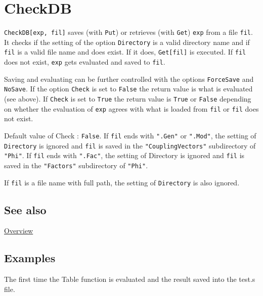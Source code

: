 \documentclass[../FeynCalcManual.tex]{subfiles}
\begin{document}
\hypertarget{checkdb}{
\section{CheckDB}\label{checkdb}}

\texttt{CheckDB[\allowbreak{}exp,\ \allowbreak{}fil]} saves (with
\texttt{Put}) or retrieves (with \texttt{Get}) \texttt{exp} from a file
\texttt{fil}. It checks if the setting of the option \texttt{Directory}
is a valid directory name and if \texttt{fil} is a valid file name and
does exist. If it does, \texttt{Get[\allowbreak{}fil]} is executed. If
\texttt{fil} does not exist, \texttt{exp} gets evaluated and saved to
\texttt{fil}.

Saving and evaluating can be further controlled with the options
\texttt{ForceSave} and \texttt{NoSave}. If the option \texttt{Check} is
set to \texttt{False} the return value is what is evaluated (see above).
If \texttt{Check} is set to \texttt{True} the return value is
\texttt{True} or \texttt{False} depending on whether the evaluation of
\texttt{exp} agrees with what is loaded from \texttt{fil} or
\texttt{fil} does not exist.

Default value of Check : \texttt{False}. If \texttt{fil} ends with
\texttt{".Gen"} or \texttt{".Mod"}, the setting of \texttt{Directory} is
ignored and \texttt{fil} is saved in the \texttt{"CouplingVectors"}
subdirectory of \texttt{"Phi"}. If \texttt{fil} ends with
\texttt{".Fac"}, the setting of Directory is ignored and \texttt{fil} is
saved in the \texttt{"Factors"} subdirectory of \texttt{"Phi"}.

If \texttt{fil} is a file name with full path, the setting of
\texttt{Directory} is also ignored.

\subsection{See also}

\hyperlink{toc}{Overview}

\subsection{Examples}

The first time the Table function is evaluated and the result saved into
the test.s file.

\begin{Shaded}
\begin{Highlighting}[]
\OperatorTok{[}\OperatorTok{[}\OperatorTok{[}\OperatorTok{,} \OperatorTok{]}\NormalTok{; }\OperatorTok{,} \OperatorTok{\{}\OperatorTok{,} \OperatorTok{\}],} \OperatorTok{]}
\end{Highlighting}
\end{Shaded}
\end{document}
